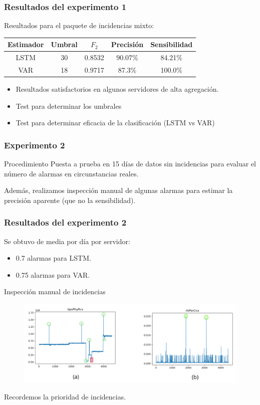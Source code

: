 \documentclass{beamer}
\begin{document}
\begin{frame}
\frametitle{Resultados del experimento 1}
Resultados para el paquete de incidencias mixto:
\begin{table}{}
	\begin{center}
		\begin{tabular}{ | c || c | c | c | c |  }
			\hline
			Estimador & Umbral & $ F_2 $ & Precisión & Sensibilidad \\
			\hline
			LSTM & 30 & 0.8532 & 90.07\% & 84.21\% \\
			VAR & 18 & 0.9717 & 87.3\% & 100.0\% \\
			\hline
		\end{tabular}
	\end{center}
\end{table}

\begin{itemize}
\item Resultados satisfactorios en algunos servidores de alta agregación.
\item Test para determinar los umbrales
\item Test para determinar eficacia de la clasificación (LSTM vs VAR)
\end{itemize}

\end{frame}

\begin{frame}
\frametitle{Experimento 2}

\begin{block}{Procedimiento}
Puesta a prueba en 15 días de datos sin incidencias para evaluar el número de alarmas en circunstancias reales. 

Además, realizamos inspección manual de algunas alarmas para estimar la precisión aparente (que no la sensibilidad).
\end{block}
\end{frame}
 

\begin{frame}
\frametitle{Resultados del experimento 2}
Se obtuvo de media por día por servidor:
\begin{itemize}
\item 0.7 alarmas para LSTM.
\item 0.75 alarmas para VAR.
\end{itemize}

\begin{block}{Inspección manual de incidencias}
\begin{figure}
\includegraphics[scale=0.3]{imagenes/manual.pdf} 
\end{figure}
\end{block}
Recordemos la prioridad de incidencias.
\end{frame}
\end{document}
